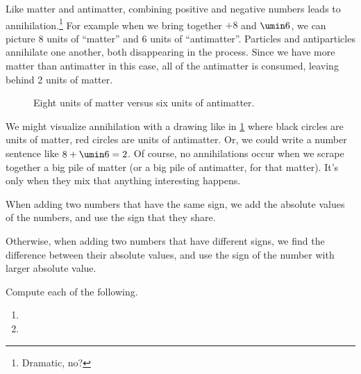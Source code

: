 Like matter and antimatter, combining positive and negative numbers leads to annihilation.\footnote{Dramatic, no?} For example when we bring together $+8$ and $\umin6$, we can picture 8 units of ``matter'' and 6 units of ``antimatter''. Particles and antiparticles annihilate one another, both disappearing in the process. Since we have more matter than antimatter in this case, all of the antimatter is consumed, leaving behind 2 units of matter.

\begin{figure}[!htbp]
\centering
{}
\caption{Eight units of matter versus six units of antimatter.}
\label{fig:intadd}
\end{figure}

We might visualize annihilation with a drawing like in \cref{fig:intadd} where black circles are units of matter, red circles are units of antimatter. Or, we could write a number sentence like $8 + \umin6 = 2$. Of course, no annihilations occur when we scrape together a big pile of matter (or a big pile of antimatter, for that matter). It's only when they mix that anything interesting happens.

\begin{boxdef}
When adding two numbers that have the same sign, we add the absolute values of the numbers, and use the sign that they share.

Otherwise, when adding two numbers that have different signs, we find the difference between their absolute values, and use the sign of the number with larger absolute value.
\end{boxdef}

\begin{boxex}
Compute each of the following.

\begin{enumerate}[itemsep=10pt]

\item {}

\item {}

\end{enumerate}
\end{boxex}

